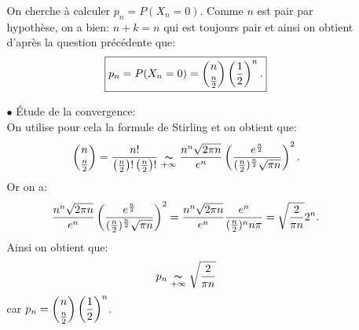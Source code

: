 \documentclass[a4paper, 11pt,reqno]{article}
\begin{document}
\begin{correction}
\begin{enumerate}
\begin{itemize}
				      \noindent On cherche \`{a} calculer $p_n=P(X_n=0)$. Comme $n$ est pair par hypoth\`{e}se, on a bien: $n+k=n$ qui est toujours pair et ainsi on obtient d'apr\`{e}s la question pr\'ec\'edente que:
				      $$\fbox{$p_n=P(X_n=0)=\displaystyle\binom{n}{\frac{n}{2}} \left(\displaystyle\frac{1}{2}  \right)^n.$}$$
			      \item[$\bullet$] \'Etude de la convergence:\\
				      \noindent On utilise pour cela la formule de Stirling et on obtient que:
				      $$\displaystyle\binom{n}{\frac{n}{2}}=\displaystyle\frac{n!}{\left(\frac{n}{2}\right)!\left(\frac{n}{2}\right)!}\underset{+\infty}{\thicksim}
					      \displaystyle\frac{n^n \sqrt{2\pi n}}{e^n} \left(\displaystyle\frac{    e^{\frac{n}{2}}}{(\frac{n}{2})^{\frac{n}{2}} \sqrt{\pi n} }\right)^2.$$
				      Or on a:
				      $$ \displaystyle\frac{n^n \sqrt{2\pi n}}{e^n} \left(\displaystyle\frac{    e^{\frac{n}{2}}}{(\frac{n}{2})^{\frac{n}{2}} \sqrt{\pi n} }\right)^2= \displaystyle\frac{n^n \sqrt{2\pi n}}{e^n}\displaystyle\frac{    e^{n}  }{(\frac{n}{2})^{n} n\pi}=\displaystyle\sqrt{\displaystyle\frac{2}{\pi n}} 2^n.$$
				      Ainsi on obtient que:
				      $$p_n\underset{+\infty}{\thicksim} \displaystyle\sqrt{\displaystyle\frac{2}{\pi n}}$$
				      car $p_n=\displaystyle\binom{n}{\frac{n}{2}} \left(\displaystyle\frac{1}{2}  \right)^n$. 
		      \end{itemize}
	\end{enumerate}
\end{correction}
\end{document}
